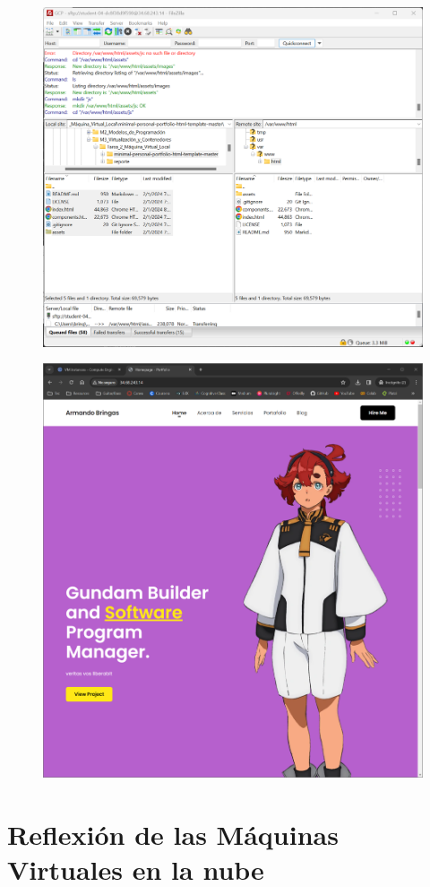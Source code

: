 \documentclass[12pt,a4paper]{article}
\begin{document}
\begin{figure}[H]
    \centering
    \includegraphics[width=1\linewidth]{M4_Servicios_Cómputo_en_la_Nube/Tarea_5_Creación_Máquinas_Virtuales_en_Nube/reporte/figuras/2_4_1_Carga_archivos.png}
    \label{fig:Google_6}
\end{figure}

\begin{figure}[H]
    \centering
    \includegraphics[width=1\linewidth]{M4_Servicios_Cómputo_en_la_Nube/Tarea_5_Creación_Máquinas_Virtuales_en_Nube/reporte/figuras/2_4_2_Carga_archivos.png}
    \label{fig:Google_7}
\end{figure}

\section{Reflexión de las Máquinas Virtuales en la nube}

\vspace{1em}
\end{document}
